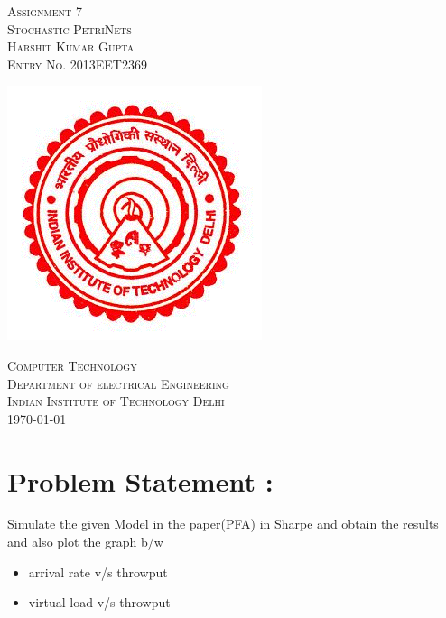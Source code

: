 \documentclass[a4paper,12pt]{article}
\begin{document}
\begin{titlepage}
\begin{center}
\textsc{\LARGE Assignment 7} \\[1.5cm]
\textsc{\large Stochastic PetriNets} \\[2.5cm]
\textsc{Harshit Kumar Gupta} \\
\textsc{Entry No. 2013EET2369} \\[2.5cm]
\begin{center}
 \includegraphics{iitd.png}
\end{center}

\textsc{Computer Technology} \\
\textsc{Department of electrical Engineering} \\
\textsc{Indian Institute of Technology Delhi} \\
\vfill
\textsc{\today} \\
\end{center}


\end{titlepage}

\tableofcontents

\newpage

\section{Problem Statement :}
                             Simulate the given Model in the paper(PFA) in Sharpe and obtain the results and also plot the graph b/w
                  \begin{itemize}
                             \item arrival rate v/s throwput
                             \item virtual load v/s throwput
                   \end{itemize}
\end{document}

